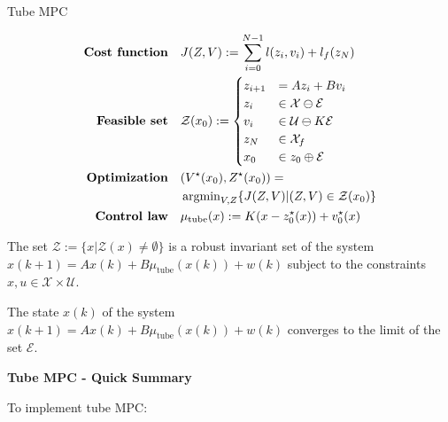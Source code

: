 \begin{sstTitleBox}{
		Tube MPC
	}

	\begin{sstOnlyFrame}
		\[\begin{aligned}
				\textbf{Cost function} & \quad
				J(Z,V):=\sum_{i=0}^{N-1}
				l(z_i,v_i)+l_f(z_N)
				\\
				\textbf{Feasible set}  & \quad
				\mathcal{Z}(x_0):=
				\begin{cases}
					z_{i+1} & = Az_i+Bv_i                         \\
					z_i     & \in \mathcal{X}\ominus\mathcal{E}   \\
					v_i     & \in \mathcal{U}\ominus K\mathcal{E} \\
					z_N     & \in \mathcal{X}_f                   \\
					x_0     & \in z_0\oplus\mathcal{E}            \\
				\end{cases}
				\\
				\textbf{Optimization}  & \quad
				(V^\star(x_0),Z^\star(x_0))=                                                   \\
				                       & \quad\operatorname{argmin}_{V,Z}\{J(Z,V)|(Z,V)\in\mathcal{Z}(x_0)\}
				\\
				\textbf{Control law}   & \quad
				\mu_\text{tube}(x):=
				K(x-z_0^\star(x))+v_0^\star(x)
			\end{aligned}\]
	\end{sstOnlyFrame}

\end{sstTitleBox}

\begin{theorem}
	The set $\mathcal{Z} := \{x|\mathcal{Z}(x)\neq \emptyset\}$
	is a robust invariant set of the system
	$x(k+1)= Ax(k)+B\mu_\text{tube}(x(k)) + w(k)$
	subject to the constraints
	$x, u \in \mathcal{X} \times \mathcal{U}$.
\end{theorem}



\begin{theorem}
	The state $x(k)$ of the system
	$x(k+1)= Ax(k)+B\mu_\text{tube}(x(k)) + w(k)$
	converges  to the  limit of the set $\mathcal{E}$.
\end{theorem}

\textbf{Tube MPC - Quick Summary}

To implement tube MPC:

